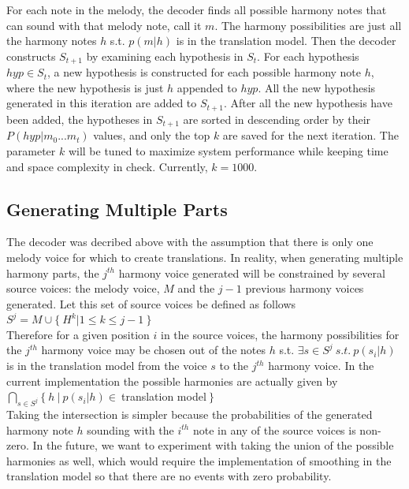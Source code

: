 \documentclass{sig-alternate}
\begin{document}
For each note in the melody, the decoder finds all possible harmony notes that can sound with that melody note, call it $m$. The harmony possibilities are just all the harmony notes $h$ s.t. $p(m | h)$ is in the translation model. Then the decoder constructs $S_{t + 1}$ by examining each hypothesis in $S_{t}$. For each hypothesis $hyp \in S_{t}$, a new hypothesis is constructed for each possible harmony note $h$, where the new hypothesis is just $h$ appended to $hyp$. All the new hypothesis generated in this iteration are added to $S_{t + 1}$. After all the new hypothesis have been added, the hypotheses in $S_{t + 1}$ are sorted in descending order by their $P(hyp | m_{0} ... m_{t})$ values, and only the top $k$ are saved for the next iteration.
The parameter $k$ will be tuned to maximize system performance while keeping time and space complexity in check. Currently, $k = 1000$.

\subsection {Generating Multiple Parts}
The decoder was decribed above with the assumption that there is only one melody voice for  which to create translations. In reality, when generating multiple harmony parts, the $j^{th}$ harmony voice generated will be constrained by several source voices: the melody voice, $M$ and the $j-1$ previous harmony voices generated. Let this set of source voices be defined as follows\\

$S^{j} = {M} \cup \{\ H^k | 1 \leq k \leq j- 1\ \} $\\


Therefore for a given position $i$ in the source voices, the harmony possibilities for the $j^{th}$ harmony voice may be chosen out of the notes $h$ s.t. $\exists s \in S^{j}\ s.t.\ p(s_{i}|h)$ is in the translation model from the voice $s$ to the $j^{th}$ harmony voice. In the current implementation the possible harmonies are actually given by \\

$\bigcap_{s \in S^{j}} \{\ h\ |\ p(s_{i} | h) \in\ $translation model$\ \}$\\

Taking the intersection is simpler because the probabilities of the generated harmony note $h$ sounding with the $i^{th}$ note in any of the source voices is non-zero. In the future, we want to experiment with taking the union of the possible harmonies as well, which would require the implementation of smoothing in the translation model so that there are no events with zero probability. 
\end{document}

